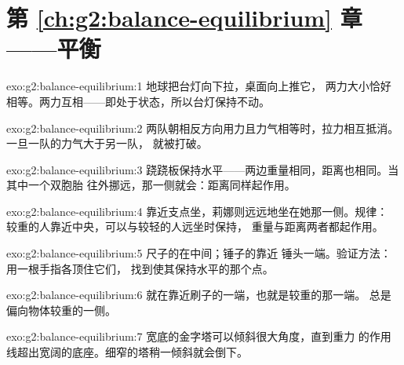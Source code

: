 \section*{第 \ref{ch:g2:balance-equilibrium} 章——平衡}

\begin{solution}{exo:g2:balance-equilibrium:1}
地球把台灯向下拉，桌面向上推它，
两力大小恰好相等。两力互相——即处于状态，所以台灯保持不动。
\end{solution}

\begin{solution}{exo:g2:balance-equilibrium:2}
两队朝相反方向用力且力气相等时，拉力相互抵消。
一旦一队的力气大于另一队，
就被打破。
\end{solution}

\begin{solution}{exo:g2:balance-equilibrium:3}
跷跷板保持水平——两边重量相同，距离也相同。当其中一个双胞胎
往外挪远，那一侧就会：距离同样起作用。
\end{solution}

\begin{solution}{exo:g2:balance-equilibrium:4}
靠近支点坐，莉娜则远远地坐在她那一侧。规律：
较重的人靠近中央，可以与较轻的人远坐时保持，
重量与距离两者都起作用。
\end{solution}

\begin{solution}{exo:g2:balance-equilibrium:5}
尺子的在中间；锤子的靠近
锤头一端。验证方法：用一根手指各顶住它们，
找到使其保持水平的那个点。
\end{solution}

\begin{solution}{exo:g2:balance-equilibrium:6}
就在靠近刷子的一端，也就是较重的那一端。
总是偏向物体较重的一侧。
\end{solution}

\begin{solution}{exo:g2:balance-equilibrium:7}
宽底的金字塔可以倾斜很大角度，直到重力
的作用线超出宽阔的底座。细窄的塔稍一倾斜就会倒下。
\end{solution}


